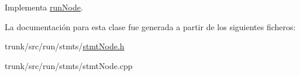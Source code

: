 Implementa \hyperlink{classrunNode_a83c10df8148829b08e04153c93d69eec}{run\-Node}.



La documentación para esta clase fue generada a partir de los siguientes ficheros\-:\begin{DoxyCompactItemize}
\item 
trunk/src/run/stmts/\hyperlink{stmtNode_8h}{stmt\-Node.\-h}\item 
trunk/src/run/stmts/stmt\-Node.\-cpp\end{DoxyCompactItemize}
